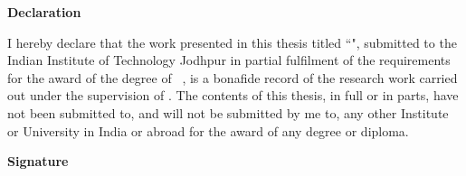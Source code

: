 \setmainfont[ Path = font/,
 BoldFont={CandaraBI}, 
 ItalicFont={booki},
 BoldItalicFont={bookbi}
 ]{bookr}


 


\begin{flushright}
\huge{ \textbf{Declaration}}
\end{flushright}
{ I hereby declare that the work presented in this thesis titled ``\emph{\ttitle{}}", submitted to the Indian Institute of Technology Jodhpur in partial fulfilment of the requirements for the award of the degree of~ \degree, is a bonafide record of the research work carried out under the supervision of \supname. The contents of this thesis, in full or in parts, have not been submitted to, and will not be submitted by me to, any other Institute or University in India or abroad for the award of any degree or diploma.}
\vspace{2cm}
\begin{flushright}
\large{\textbf{Signature}}\\
\emph{\authorname}\\
\rn
\end{flushright}
